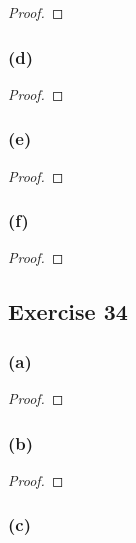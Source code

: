 \documentclass[14pt]{extarticle}
\begin{document}
\begin{proof}

\end{proof}

\subsubsection{(d)}

\begin{proof}

\end{proof}

\subsubsection{(e)}

\begin{proof}

\end{proof}

\subsubsection{(f)}

\begin{proof}

\end{proof}

\subsection{Exercise 34}

\subsubsection{(a)}

\begin{proof}

\end{proof}

\subsubsection{(b)}

\begin{proof}

\end{proof}

\subsubsection{(c)}
\end{document}
